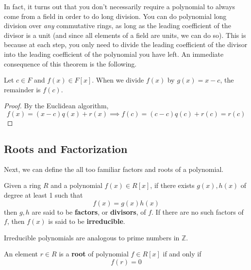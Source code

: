   In fact, it turns out that you don't necessarily require a polynomial to always come from a field in order to do long division. You can do polynomial long division over \textit{any} commutative rings, as long as the leading coefficient of the divisor is a unit (and since all elements of a field are units, we can do so). This is because at each step, you only need to divide the leading coefficient of the divisor into the leading coefficient of the polynomial you have left. An immediate consequence of this theorem is the following. 

  \begin{corollary}
    Let $c \in F$ and $f(x) \in F[x]$. When we divide $f(x)$ by $g(x) = x - c$, the remainder is $f(c)$. 
  \end{corollary}
  \begin{proof}
    By the Euclidean algorithm, 
    \begin{equation}
      f(x) = (x - c) q(x) + r(x) \implies f(c) = (c - c) q(c) + r(c) = r(c)
    \end{equation}
  \end{proof} 

\subsection{Roots and Factorization}

  Next, we can define the all too familiar factors and roots of a polynomial. 

  \begin{definition}[Factor]
    Given a ring $R$ and a polynomial $f(x) \in R[x]$, if there exists $g(x), h(x)$ of degree at least 1 such that 
    \begin{equation}
      f(x) = g(x) h(x)
    \end{equation}
    then $g, h$ are said to be \textbf{factors}, or \textbf{divisors}, of $f$. If there are no such factors of $f$, then $f(x)$ is said to be \textbf{irreducible}. 
  \end{definition}

  Irreducible polynomials are analogous to prime numbers in $\mathbb{Z}$. 

  \begin{definition}
    An element $r \in R$ is a \textbf{root} of polynomial $f \in R[x]$ if and only if 
    \begin{equation}
      f(r) = 0
    \end{equation}
  \end{definition} 

